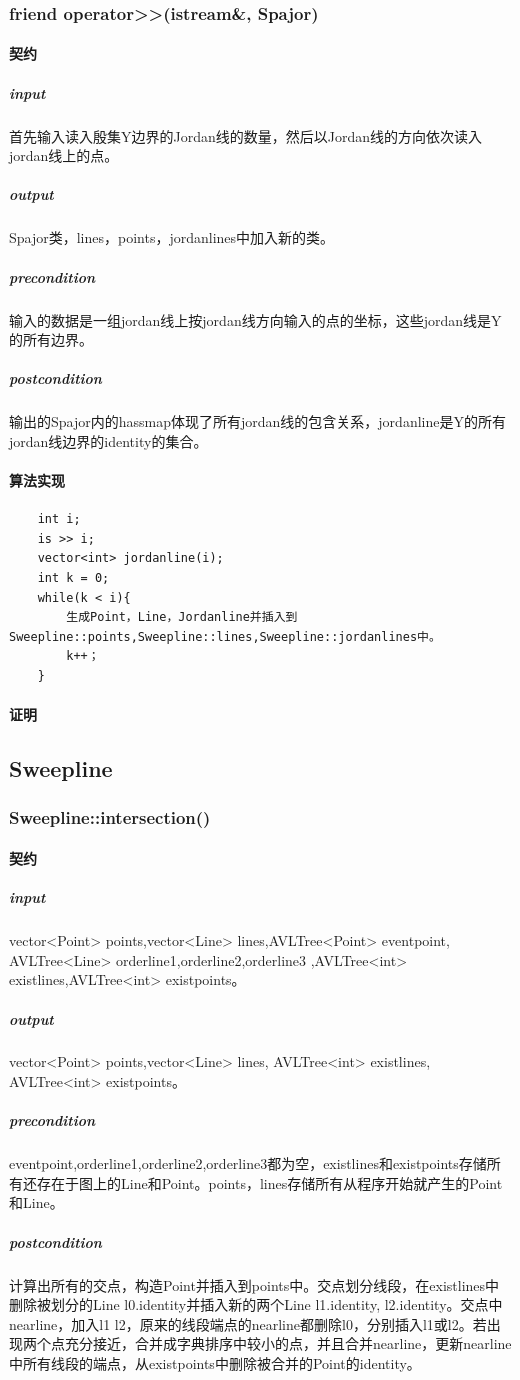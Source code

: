 \documentclass[a4paper]{book}
\numberwithin{equation}{chapter}
\theoremstyle{definition}
\begin{document}
\subsubsection{friend operator>>(istream\&, Spajor)}
\paragraph{契约}
\subparagraph{input}
首先输入读入殷集Y边界的Jordan线的数量，然后以Jordan线的方向依次读入jordan线上的点。
\subparagraph{output}
Spajor类，lines，points，jordanlines中加入新的类。
\subparagraph{precondition}
输入的数据是一组jordan线上按jordan线方向输入的点的坐标，这些jordan线是Y的所有边界。
\subparagraph{postcondition}
输出的Spajor内的hassmap体现了所有jordan线的包含关系，jordanline是Y的所有jordan线边界的identity的集合。
\paragraph{算法实现}
\begin{lstlisting}
	int i;
	is >> i;
	vector<int> jordanline(i);
	int k = 0;
	while(k < i){
		生成Point，Line，Jordanline并插入到Sweepline::points,Sweepline::lines,Sweepline::jordanlines中。
		k++；
	}
\end{lstlisting}
\paragraph{证明}

\subsection{Sweepline}
\subsubsection{Sweepline::intersection()}
\paragraph{契约}
\subparagraph{input}
vector<Point> points,vector<Line> lines,AVLTree<Point> eventpoint, AVLTree<Line> orderline1,orderline2,orderline3 ,AVLTree<int> existlines,AVLTree<int> existpoints。
\subparagraph{output}
vector<Point> points,vector<Line> lines, AVLTree<int> existlines, AVLTree<int> existpoints。
\subparagraph{precondition}
eventpoint,orderline1,orderline2,orderline3都为空，existlines和existpoints存储所有还存在于图上的Line和Point。points，lines存储所有从程序开始就产生的Point和Line。
\subparagraph{postcondition}
计算出所有的交点，构造Point并插入到points中。交点划分线段，在existlines中删除被划分的Line l0.identity并插入新的两个Line l1.identity, l2.identity。交点中nearline，加入l1 l2，原来的线段端点的nearline都删除l0，分别插入l1或l2。若出现两个点充分接近，合并成字典排序中较小的点，并且合并nearline，更新nearline中所有线段的端点，从existpoints中删除被合并的Point的identity。
\end{document}
